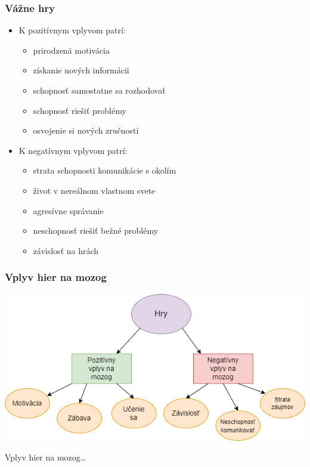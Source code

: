 \documentclass{beamer}
\begin{document}
\begin{frame}[fragile=singleslide]\frametitle{Vážne hry}
\begin{itemize}
\item K pozitívnym vplyvom patrí: 
	\begin{itemize}
	\item prirodzená motivácia
    \item získanie nových informácii
    \item schopnosť samostatne sa rozhodovať
    \item schopnosť riešiť problémy
    \item osvojenie si nových zručností
	\end{itemize}
\item K negatívnym vplyvom patrí: 
    \begin{itemize}
    \item strata schopnosti komunikácie s okolím
    \item život v nereálnom vlastnom svete
    \item agresívne správanie
    \item neschopnosť riešiť bežné problémy
    \item závislosť na hrách
    \end{itemize}
\end{itemize}
\end{frame}


\begin{frame}[fragile=singleslide]\frametitle{Vplyv hier na mozog}

\includegraphics[scale=.35]{vplyv_na_mozog.drawio.png}

{\tiny Vplyv hier na mozog\ldots}
\end{frame}
\end{document}
